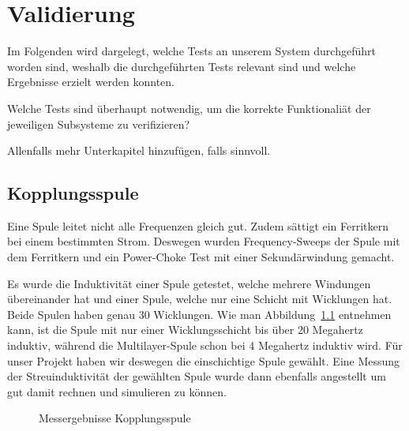 \chapter{Validierung}
\label{chap:validierung}

Im Folgenden  wird dargelegt,  welche Tests  an unserem  System durchgef\"uhrt
worden  sind, weshalb  die  durchgef\"uhrten Tests  relevant  sind und  welche
Ergebnisse erzielt werden konnten.

\anweisung  Welche   Tests  sind   \"uberhaupt  notwendig,  um   die  korrekte
Funktionali\"at der jeweiligen Subsysteme zu verifizieren?

\anweisung Allenfalls mehr Unterkapitel hinzuf\"ugen, falls sinnvoll.

\section{Kopplungsspule}
\label{sec:val:coupling:coil}

Eine  Spule  leitet nicht  alle  Frequenzen  gleich gut. Zudem  s\"attigt  ein
Ferritkern bei  einem bestimmten  Strom. Deswegen wurden  Frequency-Sweeps der
Spule mit dem Ferritkern und  ein Power-Choke Test mit einer Sekund\"arwindung
gemacht.

Es   wurde   die  Induktivit\"at   einer   Spule   getestet,  welche   mehrere
Windungen  \"ubereinander  hat  und  einer  Spule,  welche  nur  eine  Schicht
mit  Wicklungen   hat. Beide  Spulen   haben  genau  30   Wicklungen. Wie  man
Abbildung~\ref{fig:meas:coupling:coil:L} entnehmen kann, ist die Spule mit nur
einer  Wicklungsschicht  bis  \"uber  20  Megahertz  induktiv,  w\"ahrend  die
Multilayer-Spule  schon bei  4  Megahertz induktiv  wird. F\"ur unser  Projekt
haben  wir  deswegen  die  einschichtige  Spule  gew\"ahlt. Eine  Messung  der
Streuinduktivit\"at der  gew\"ahlten Spule wurde dann  ebenfalls angestellt um
gut damit rechnen und simulieren zu k\"onnen.

\begin{figure}[h!tb]
    \centering
    
    \caption[Messresultate Kopplungsspule]{Messergebnisse Kopplungsspule}
    \label{fig:meas:coupling:coil:L}
\end{figure}

